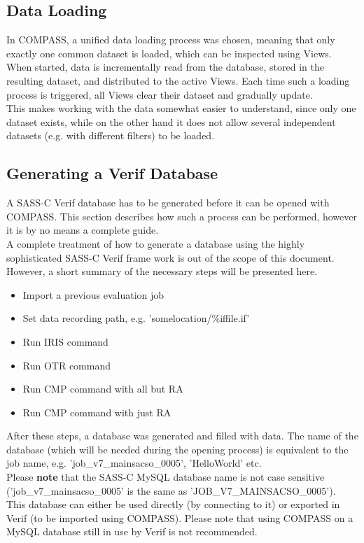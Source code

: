 \subsection*{Data Loading}
In COMPASS, a unified data loading process was chosen, meaning that only exactly one common dataset is loaded, which can be inspected using Views. When started, data is incrementally read from the database, stored in the resulting dataset, and distributed to the active Views. Each time such a loading process is triggered, all Views clear their dataset and gradually update. \\
This makes working with the data somewhat easier to understand, since only one dataset exists, while on the other hand it does not allow several independent datasets (e.g. with different filters) to be loaded.

\subsection*{Generating a Verif Database}
\label{sec:generation}

A SASS-C Verif database has to be generated before it can be opened with COMPASS.  This section describes how such
a process can be performed, however it is by no means a complete guide. \\

A complete treatment of how to generate a database using the highly sophisticated SASS-C Verif frame work  is  out  of  the  scope  of  this  document.   However, a short summary of the necessary steps will be presented here.\\

\begin{itemize}  
\item Import a previous evaluation job
\item Set data recording path, e.g. 'somelocation/\%iffile.if'
\item Run IRIS command
\item Run OTR command
\item Run CMP command with all but RA
\item Run CMP command with just RA
\end{itemize}

After  these  steps,  a  database  was  generated  and  filled  with  data.   The  name  of  the  database  (which
will  be  needed  during  the  opening  process)  is  equivalent  to  the  job  name,  e.g.   'job\_v7\_mainsacso\_0005', 'HelloWorld' etc. \\

Please \textbf{note} that the SASS-C MySQL database name is not case sensitive ('job\_v7\_mainsacso\_0005' is the same as 'JOB\_V7\_MAINSACSO\_0005'). \\
 
This database can either be used directly (by connecting to it) or exported in Verif (to be imported using COMPASS). Please note that using COMPASS on a MySQL database still in use by Verif is not recommended.
 
